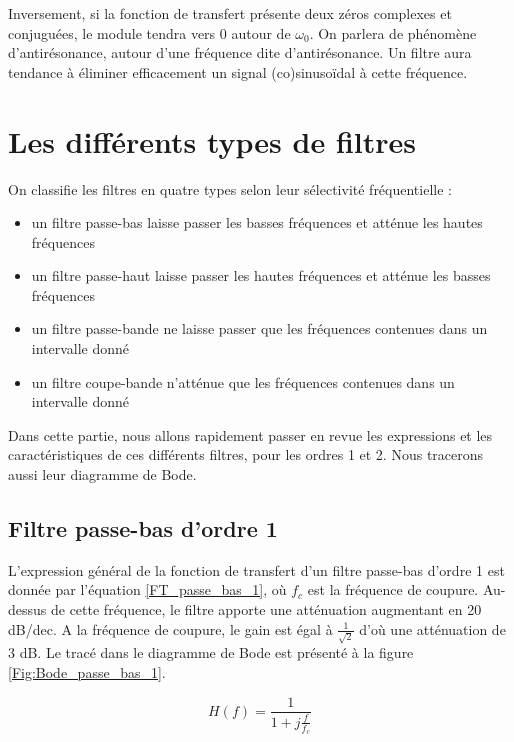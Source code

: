	Inversement, si la fonction de transfert présente deux zéros complexes et conjuguées, le module tendra vers 0 autour de $\omega_{0}$. On parlera de phénomène d'antirésonance, autour d'une fréquence dite d'antirésonance. Un filtre aura tendance à éliminer efficacement un signal (co)sinusoïdal à cette fréquence.
	
	\vspace{1\baselineskip}
	
	
	\section{Les différents types de filtres}
	On classifie les filtres en quatre types selon leur sélectivité fréquentielle : 
	\begin{itemize}
		\item un filtre passe-bas laisse passer les basses fréquences et atténue les hautes fréquences
		\item un filtre passe-haut laisse passer les hautes fréquences et atténue les basses fréquences
		\item un filtre passe-bande ne laisse passer que les fréquences contenues dans un intervalle donné
		\item un filtre coupe-bande n'atténue  que les fréquences contenues dans un intervalle donné
	\end{itemize}

	Dans cette partie, nous allons rapidement passer en revue les expressions et les caractéristiques de ces différents filtres, pour les ordres 1 et 2. Nous tracerons aussi leur diagramme de Bode.
	
	
	\subsection{Filtre passe-bas d'ordre 1}
	L'expression général de la fonction de transfert d'un filtre passe-bas d'ordre 1 est donnée par l'équation \ref{FT_passe_bas_1}, où $f_{c}$ est la fréquence de coupure. Au-dessus de cette fréquence, le filtre apporte une atténuation augmentant en 20 dB/dec. A la fréquence de coupure, le gain est égal à $\frac{1}{\sqrt{2}}$ d'où une atténuation de 3 dB. Le tracé dans le diagramme de Bode est présenté à la figure \ref{Fig:Bode_passe_bas_1}.
	
	\begin{equation}\label{FT_passe_bas_1}
	H(f) = \frac{1}{1+j\frac{f}{f_{c}}}
	\end{equation}
	
